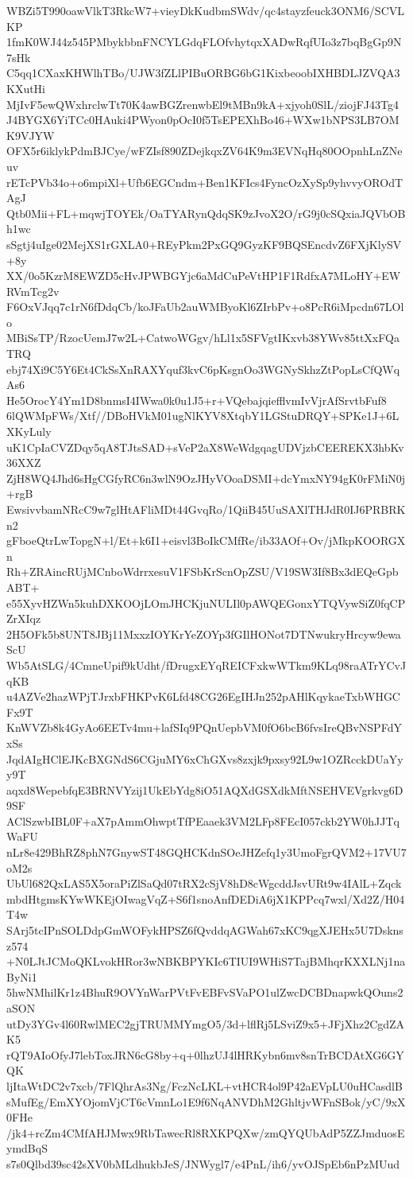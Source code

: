 WBZi5T990oawVlkT3RkcW7+vieyDkKudbmSWdv/qc4stayzfeuck3ONM6/SCVLKP
1fmK0WJ44z545PMbykbbnFNCYLGdqFLOfvhytqxXADwRqfUIo3z7bqBgGp9N7sHk
C5qq1CXaxKHWlhTBo/UJW3fZLlPIBuORBG6bG1KixbeoobIXHBDLJZVQA3KXutHi
MjIvF5ewQWxhrclwTt70K4awBGZrenwbEl9tMBn9kA+xjyoh0SlL/ziojFJ43Tg4
J4BYGX6YiTCc0HAuki4PWyon0pOcI0f5TsEPEXhBo46+WXw1bNPS3LB7OMK9VJYW
OFX5r6iklykPdmBJCye/wFZIsf890ZDejkqxZV64K9m3EVNqHq80OOpnhLnZNeuv
rETcPVb34o+o6mpiXl+Ufb6EGCndm+Ben1KFIcs4FyncOzXySp9yhvvyOROdTAgJ
Qtb0Mii+FL+mqwjTOYEk/OaTYARynQdqSK9zJvoX2O/rG9j0cSQxiaJQVbOBh1wc
sSgtj4uIge02MejXS1rGXLA0+REyPkm2PxGQ9GyzKF9BQSEncdvZ6FXjKlySV+8y
XX/0o5KzrM8EWZD5cHvJPWBGYjc6aMdCuPeVtHP1F1RdfxA7MLoHY+EWRVmTcg2v
F6OxVJqq7c1rN6fDdqCb/koJFaUb2auWMByoKl6ZIrbPv+o8PcR6iMpcdn67LOlo
MBiSsTP/RzocUemJ7w2L+CatwoWGgv/hLl1x5SFVgtIKxvb38YWv85ttXxFQaTRQ
ebj74Xi9C5Y6Et4CkSsXnRAXYquf3kvC6pKsgnOo3WGNySkhzZtPopLsCfQWqAs6
He5OrocY4Ym1D8bnmsI4IWwa0k0u1J5+r+VQebajqiefflvmIvVjrAfSrvtbFuf8
6lQWMpFWs/Xtf//DBoHVkM01ugNlKYV8XtqbY1LGStuDRQY+SPKe1J+6LXKyLuly
uK1CpIaCVZDqy5qA8TJtsSAD+sVeP2aX8WeWdgqagUDVjzbCEEREKX3hbKv36XXZ
ZjH8WQ4Jhd6sHgCGfyRC6n3wlN9OzJHyVOoaDSMI+dcYmxNY94gK0rFMiN0j+rgB
EwsivvbamNRcC9w7glHtAFliMDt44GvqRo/1QiiB45UuSAXlTHJdR0IJ6PRBRKn2
gFboeQtrLwTopgN+l/Et+k6I1+eisvl3BoIkCMfRe/ib33AOf+Ov/jMkpKOORGXn
Rh+ZRAincRUjMCnboWdrrxesuV1FSbKrScnOpZSU/V19SW3If8Bx3dEQeGpbABT+
e55XyvHZWn5kuhDXKOOjLOmJHCKjuNULIl0pAWQEGonxYTQVywSiZ0fqCPZrXIqz
2H5OFk5b8UNT8JBj11MxxzIOYKrYeZOYp3fGIlHONot7DTNwukryHrcyw9ewaScU
Wb5AtSLG/4CmneUpif9kUdht/fDrugxEYqREICFxkwWTkm9KLq98raATrYCvJqKB
u4AZVe2hazWPjTJrxbFHKPvK6Lfd48CG26EgIHJn252pAHlKqykaeTxbWHGCFx9T
KnWVZb8k4GyAo6EETv4mu+lafSIq9PQnUepbVM0fO6bcB6fvsIreQBvNSPFdYxSs
JqdAIgHClEJKcBXGNdS6CGjuMY6xChGXvs8zxjk9pxsy92L9w1OZRcckDUaYyy9T
aqxd8WepebfqE3BRNVYzij1UkEbYdg8iO51AQXdGSXdkMftNSEHVEVgrkvg6D9SF
AClSzwbIBL0F+aX7pAmmOhwptTfPEaaek3VM2LFp8FEcI057ckb2YW0hJJTqWaFU
nLr8e429BhRZ8phN7GnywST48GQHCKdnSOeJHZefq1y3UmoFgrQVM2+17VU7oM2s
UbUl682QxLAS5X5oraPiZlSaQd07tRX2cSjV8hD8cWgcddJsvURt9w4IAlL+Zqck
mbdHtgmsKYwWKEjOIwagVqZ+S6f1snoAnfDEDiA6jX1KPPcq7wxl/Xd2Z/H04T4w
SArj5tcIPnSOLDdpGmWOFykHPSZ6fQvddqAGWah67xKC9qgXJEHx5U7Dsknsz574
+N0LJtJCMoQKLvokHRor3wNBKBPYKIc6TIUI9WHiS7TajBMhqrKXXLNj1naByNi1
5hwNMhilKr1z4BhuR9OVYnWarPVtFvEBFvSVaPO1ulZwcDCBDnapwkQOuns2aSON
utDy3YGv4l60RwlMEC2gjTRUMMYmgO5/3d+lflRj5LSviZ9x5+JFjXhz2CgdZAK5
rQT9AIoOfyJ7lebToxJRN6cG8by+q+0lhzUJ4lHRKybn6mv8snTrBCDAtXG6GYQK
ljItaWtDC2v7xcb/7FlQhrAs3Ng/FczNcLKL+vtHCR4ol9P42aEVpLU0uHCasdlB
sMufEg/EmXYOjomVjCT6cVmnLo1E9f6NqANVDhM2GhltjvWFnSBok/yC/9xX0FHe
/jk4+rcZm4CMfAHJMwx9RbTawecRl8RXKPQXw/zmQYQUbAdP5ZZJmduosEymdBqS
s7s0Qlbd39sc42sXV0bMLdhukbJeS/JNWygl7/e4PnL/ih6/yvOJSpEb6nPzMUud
